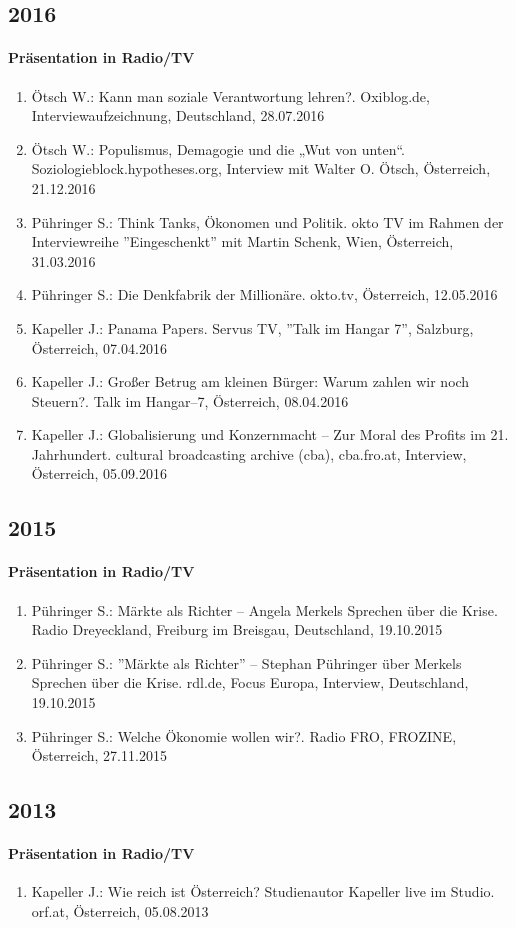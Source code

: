 \subsection*{2016}
\paragraph{Präsentation in Radio/TV}
\begin{enumerate}
	\item Ötsch W.: Kann man soziale Verantwortung lehren?. Oxiblog.de, Interviewaufzeichnung, Deutschland, 28.07.2016
	\item Ötsch W.: Populismus, Demagogie und die „Wut von unten“. Soziologieblock.hypotheses.org, Interview mit Walter O. Ötsch, Österreich, 21.12.2016
	\item Pühringer S.: Think Tanks, Ökonomen und Politik. okto TV im Rahmen der Interviewreihe ''Eingeschenkt'' mit Martin Schenk, Wien, Österreich, 31.03.2016
	\item Pühringer S.: Die Denkfabrik der Millionäre. okto.tv, Österreich, 12.05.2016
	\item Kapeller J.: Panama Papers. Servus TV, ''Talk im Hangar 7'', Salzburg, Österreich, 07.04.2016
	\item Kapeller J.: Großer Betrug am kleinen Bürger: Warum zahlen wir noch Steuern?. Talk im Hangar--7, Österreich, 08.04.2016
	\item Kapeller J.: Globalisierung und Konzernmacht – Zur Moral des Profits im 21. Jahrhundert. cultural broadcasting archive (cba), cba.fro.at, Interview, Österreich, 05.09.2016
\end{enumerate}
\subsection*{2015}
\paragraph{Präsentation in Radio/TV}
\begin{enumerate}
	\item Pühringer S.: Märkte als Richter – Angela Merkels Sprechen über die Krise. Radio Dreyeckland, Freiburg im Breisgau, Deutschland, 19.10.2015
	\item Pühringer S.: ''Märkte als Richter'' -- Stephan Pühringer über Merkels Sprechen über die Krise. rdl.de, Focus Europa, Interview, Deutschland, 19.10.2015
	\item Pühringer S.: Welche Ökonomie wollen wir?. Radio FRO, FROZINE, Österreich, 27.11.2015
\end{enumerate}
\subsection*{2013}
\paragraph{Präsentation in Radio/TV}
\begin{enumerate}
	\item Kapeller J.: Wie reich ist Österreich? Studienautor Kapeller live im Studio. orf.at, Österreich, 05.08.2013
\end{enumerate}
